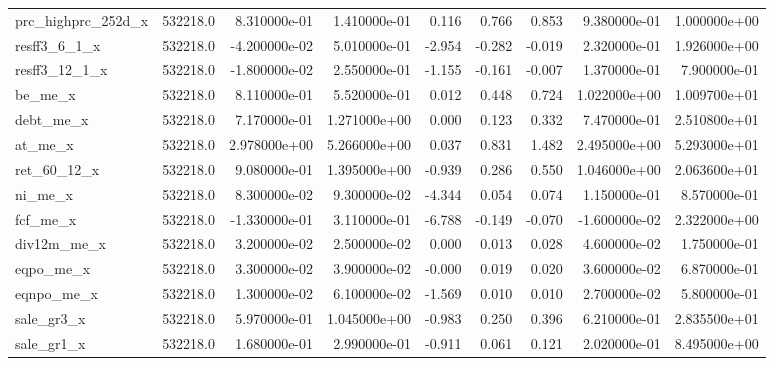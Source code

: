 \documentclass[12pt]{article}
\begin{document}
{\begin{landscape}
\begin{longtable}{|l|r|r|r|r|r|r|r|r|}
prc\_highprc\_252d\_x     &  532218.0 &  8.310000e-01 &  1.410000e-01 &       0.116 &        0.766 &        0.853 &  9.380000e-01 &  1.000000e+00 \\
resff3\_6\_1\_x           &  532218.0 & -4.200000e-02 &  5.010000e-01 &      -2.954 &       -0.282 &       -0.019 &  2.320000e-01 &  1.926000e+00 \\
resff3\_12\_1\_x          &  532218.0 & -1.800000e-02 &  2.550000e-01 &      -1.155 &       -0.161 &       -0.007 &  1.370000e-01 &  7.900000e-01 \\
be\_me\_x                &  532218.0 &  8.110000e-01 &  5.520000e-01 &       0.012 &        0.448 &        0.724 &  1.022000e+00 &  1.009700e+01 \\
debt\_me\_x              &  532218.0 &  7.170000e-01 &  1.271000e+00 &       0.000 &        0.123 &        0.332 &  7.470000e-01 &  2.510800e+01 \\
at\_me\_x                &  532218.0 &  2.978000e+00 &  5.266000e+00 &       0.037 &        0.831 &        1.482 &  2.495000e+00 &  5.293000e+01 \\
ret\_60\_12\_x            &  532218.0 &  9.080000e-01 &  1.395000e+00 &      -0.939 &        0.286 &        0.550 &  1.046000e+00 &  2.063600e+01 \\
ni\_me\_x                &  532218.0 &  8.300000e-02 &  9.300000e-02 &      -4.344 &        0.054 &        0.074 &  1.150000e-01 &  8.570000e-01 \\
fcf\_me\_x               &  532218.0 & -1.330000e-01 &  3.110000e-01 &      -6.788 &       -0.149 &       -0.070 & -1.600000e-02 &  2.322000e+00 \\
div12m\_me\_x            &  532218.0 &  3.200000e-02 &  2.500000e-02 &       0.000 &        0.013 &        0.028 &  4.600000e-02 &  1.750000e-01 \\
eqpo\_me\_x              &  532218.0 &  3.300000e-02 &  3.900000e-02 &      -0.000 &        0.019 &        0.020 &  3.600000e-02 &  6.870000e-01 \\
eqnpo\_me\_x             &  532218.0 &  1.300000e-02 &  6.100000e-02 &      -1.569 &        0.010 &        0.010 &  2.700000e-02 &  5.800000e-01 \\
sale\_gr3\_x             &  532218.0 &  5.970000e-01 &  1.045000e+00 &      -0.983 &        0.250 &        0.396 &  6.210000e-01 &  2.835500e+01 \\
sale\_gr1\_x             &  532218.0 &  1.680000e-01 &  2.990000e-01 &      -0.911 &        0.061 &        0.121 &  2.020000e-01 &  8.495000e+00 \\

\end{longtable}
\end{landscape}}
\end{document}
